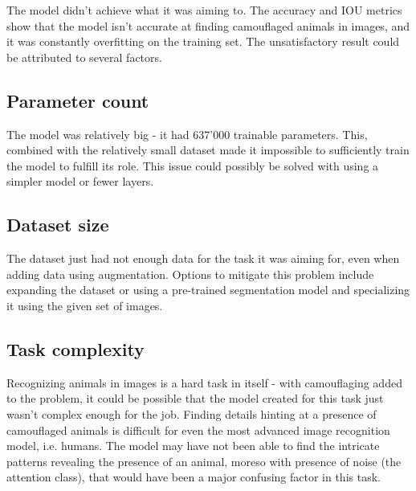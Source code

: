\documentclass[../main.tex]{subfiles}
\begin{document}
The model didn't achieve what it was aiming to. The accuracy and IOU metrics show that the model isn't accurate at finding camouflaged animals in images, and it was constantly overfitting on the training set. The unsatisfactory result could be attributed to several factors.

\subsection*{Parameter count}
The model was relatively big - it had 637'000 trainable parameters. This, combined with the relatively small dataset made it impossible to sufficiently train the model to fulfill its role. This issue could possibly be solved with using a simpler model or fewer layers.

\subsection*{Dataset size}
The dataset just had not enough data for the task it was aiming for, even when adding data using augmentation. Options to mitigate this problem include expanding the dataset or using a pre-trained segmentation model and specializing it using the given set of images.

\subsection*{Task complexity}
Recognizing animals in images is a hard task in itself - with camouflaging added to the problem, it could be possible that the model created for this task just wasn't complex enough for the job. Finding details hinting at a presence of camouflaged animals is difficult for even the most advanced image recognition model, i.e. humans. The model may have not been able to find the intricate patterns revealing the presence of an animal, moreso with presence of noise (the attention class), that would have been a major confusing factor in this task.
\end{document}
